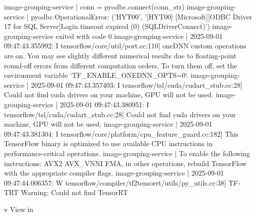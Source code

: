 image-grouping-service  |     conn = pyodbc.connect(conn_str)
image-grouping-service  | pyodbc.OperationalError: ('HYT00', '[HYT00] [Microsoft][ODBC Driver 17 for SQL Server]Login timeout expired (0) (SQLDriverConnect)')
image-grouping-service exited with code 0
image-grouping-service  | 2025-09-01 09:47:43.355992: I tensorflow/core/util/port.cc:110] oneDNN custom operations are on. You may see slightly different numerical results due to floating-point round-off errors from different computation orders. To turn them off, set the environment variable `TF_ENABLE_ONEDNN_OPTS=0`.
image-grouping-service  | 2025-09-01 09:47:43.357403: I tensorflow/tsl/cuda/cudart_stub.cc:28] Could not find cuda drivers on your machine, GPU will not be used.
image-grouping-service  | 2025-09-01 09:47:43.380951: I tensorflow/tsl/cuda/cudart_stub.cc:28] Could not find cuda drivers on your machine, GPU will not be used.
image-grouping-service  | 2025-09-01 09:47:43.381304: I tensorflow/core/platform/cpu_feature_guard.cc:182] This TensorFlow binary is optimized to use available CPU instructions in performance-critical operations.
image-grouping-service  | To enable the following instructions: AVX2 AVX_VNNI FMA, in other operations, rebuild TensorFlow with the appropriate compiler flags.
image-grouping-service  | 2025-09-01 09:47:44.006357: W tensorflow/compiler/tf2tensorrt/utils/py_utils.cc:38] TF-TRT Warning: Could not find TensorRT


v View in














